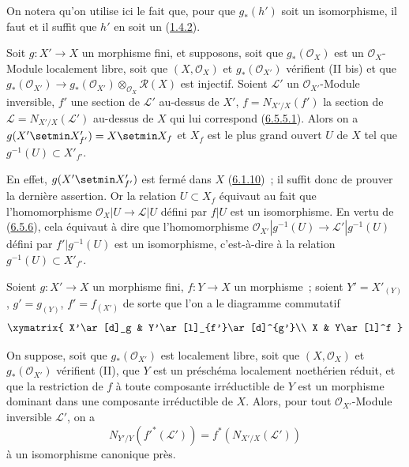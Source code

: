 On notera qu'on utilise ici le fait que, pour que $g_*(h')$ soit un
isomorphisme, il faut et il suffit que $h'$ en soit un
(\hyperref[II.1.4.2-fr]{1.4.2}).

\begin{corollary}[6.5.7]
\label{II.6.5.7-fr}
Soit $g:X'\to X$ un morphisme fini, et supposons, soit que
$g_*(\mathcal{O}_X)$ est un $\mathcal{O}_X$-Module localement libre, soit
que $(X,\mathcal{O}_X)$ et $g_*(\mathcal{O}_{X'})$ vérifient \textup{(II bis)}
et que
$g_*(\mathcal{O}_{X'})\to
g_*(\mathcal{O}_{X'})\otimes_{\mathcal{O}_X}\mathcal{R}(X)$ est injectif.
Soient $\mathcal{L}'$ un $\mathcal{O}_{X'}$-Module inversible, $f'$ une
section de $\mathcal{L}'$ au-dessus de $X'$, $f=N_{X'/X}(f')$ la section de
$\mathcal{L}=N_{X'/X}(\mathcal{L}')$ au-dessus de $X$ qui
lui correspond
\textup{(\hyperref[II.6.5.5.1-fr]{6.5.5.1})}.
Alors on a $g(X'\setmin X'_{f'})=X\setmin X_f$ et $X_f$ est le plus grand ouvert $U$ de
$X$ tel que $g^{-1}(U)\subset X'_{f'}$.
\end{corollary}

En effet, $g(X'\setmin X'_{f'})$ est fermé dans $X$
(\hyperref[II.6.1.10-fr]{6.1.10})~; il suffit donc de prouver la dernière
assertion. Or la relation $U\subset X_f$ équivaut au fait que l'homomorphisme
$\mathcal{O}_X|U\to\mathcal{L}|U$ défini par $f|U$ est un isomorphisme. En
vertu de (\hyperref[II.6.5.6-fr]{6.5.6}), cela équivaut à dire que
l'homomorphisme
$\mathcal{O}_{X'}|g^{-1}(U)\to\mathcal{L}'|g^{-1}(U)$ défini par
$f'|g^{-1}(U)$ est un isomorphisme, c'est-à-dire à la relation
$g^{-1}(U)\subset X'_{f'}$.

\begin{proposition}[6.5.8]
\label{II.6.5.8-fr}
Soient $g:X'\to X$ un morphisme fini, $f:Y\to X$ un morphisme~; soient
$Y'=X'_{(Y)}$, $g'=g_{(Y)}$, $f'=f_{(X')}$ de sorte que l'on a le diagramme
commutatif
\[
\xymatrix{
X'\ar[d]_g & Y'\ar[l]_{f'}\ar[d]^{g'}\\
X & Y\ar[l]^f
}
\]

On suppose, soit que $g_*(\mathcal{O}_{X'})$ est localement libre, soit que
$(X,\mathcal{O}_X)$ et $g_*(\mathcal{O}_{X'})$ vérifient \textup{(II)}, que $Y$ est un
préschéma localement noethérien réduit, et que la restriction de $f$ à toute
composante irréductible de $Y$ est un morphisme dominant dans une composante
irréductible de $X$. Alors, pour tout $\mathcal{O}_{X'}$-Module inversible
$\mathcal{L}'$, on a
\[
N_{Y'/Y}({f'}^*(\mathcal{L}'))=f^*(N_{X'/X}(\mathcal{L}'))
\]
à un isomorphisme canonique près.
\end{proposition}

